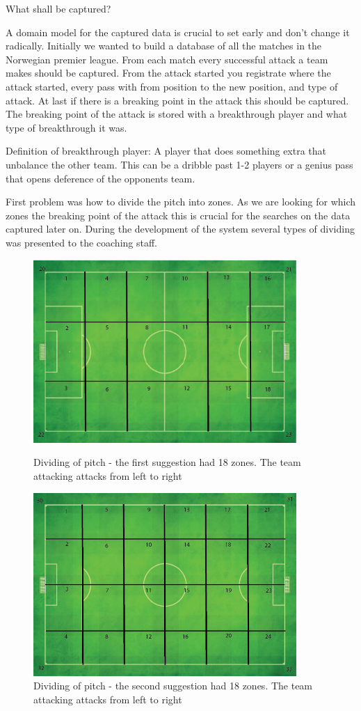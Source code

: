 What shall be captured? 


A domain model for the captured data is crucial to set early and don't change it radically. Initially we wanted to build a database of all the matches in the Norwegian premier league. From each match every successful attack a team makes should be captured. From the attack started you registrate where the attack started, every pass with from position to the new position, and type of attack. At last if there is a breaking point in the attack this should be captured. The breaking point of the attack is stored with a breakthrough player and what type of breakthrough it was.

Definition of breakthrough player: A player that does something extra that unbalance the other team. This can be a dribble past 1-2 players or a genius pass that opens deference of the opponents team. 

First problem was how to divide the pitch into zones. As we are looking for which zones the breaking point of the attack this is crucial for the searches on the data captured later on. During the development of the system several types of dividing was presented to the coaching staff. 

\begin{figure}[ht!]
\centering
\includegraphics[width=100mm]{images/general/first_zones.png}
\caption{Dividing of pitch - the first suggestion had 18 zones. The team attacking attacks from left to right}
\includegraphics[width=100mm]{images/general/second_zones.png}
\caption{Dividing of pitch - the second suggestion had 18 zones. The team attacking attacks from left to right}
\label{overflow}
\end{figure}
